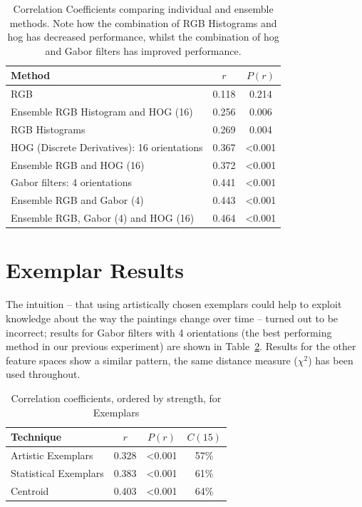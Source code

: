 \begin{table}[h]
\centering
\begin{tabular}{|l|c|c|}\hline
Method	& $r$	& $P(r)$ \\ \hline
RGB 						& 0.118  & 0.214 \\
Ensemble RGB Histogram and HOG (16)		& 0.256 & 0.006 \\
RGB Histograms					& 0.269 & 0.004 \\
HOG (Discrete Derivatives): 16 orientations	& 0.367 & \textless0.001 \\
Ensemble RGB and HOG (16)			& 0.372 & \textless0.001 \\
Gabor filters: 4 orientations			& 0.441 & \textless0.001 \\
Ensemble RGB and Gabor (4)			& 0.443	& \textless0.001 \\
Ensemble RGB, Gabor (4) and HOG (16)		& 0.464	& \textless0.001 \\
\hline
\end{tabular}
\caption[Correlation Coefficients comparing individual and ensemble methods]{Correlation Coefficients comparing individual and ensemble methods. Note how the 
combination of RGB Histograms and \gls{hog} has decreased performance, whilst the combination of
\gls{hog} and Gabor filters has improved performance.}\label{tab:ensemble-results}
\end{table}

\newpage
\section{Exemplar Results}
The intuition -- that using artistically chosen exemplars could help to exploit knowledge about 
the way the paintings change over time -- turned out to be incorrect; results for Gabor filters 
with 4 orientations (the best performing method in our previous experiment) are shown in 
Table~\ref{artistic_exemplars}.  Results for the other feature spaces show a similar pattern, the 
same distance measure ($\chi^2$) has been used throughout. 

\begin{table}[h]
\centering
\begin{tabular}{|p{3.5cm}|c|c|c|}
\hline
Technique     & $r$ & $P(r)$ & $C(15)$ \\ \hline
Artistic Exemplars	& 0.328	& \textless0.001 & 57\%\\
Statistical Exemplars	& 0.383	& \textless0.001 & 61\%\\
Centroid		& 0.403	& \textless0.001 & 64\%\\
\hline
\end{tabular}
\vspace{0.5em}
\caption{Correlation coefficients, ordered by strength, for Exemplars
\label{artistic_exemplars}}
\end{table}

